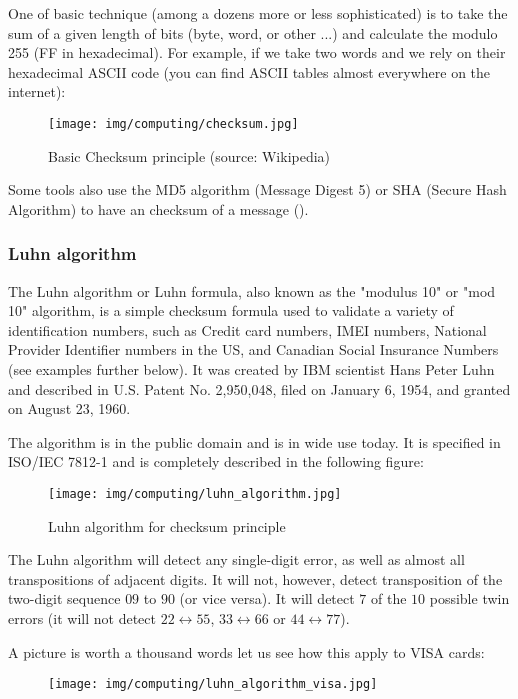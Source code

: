 	One of basic technique (among a dozens more or less sophisticated) is to take the sum of a given length of bits (byte, word, or other ...) and calculate the modulo 255 (FF in hexadecimal). For example, if we take two words and we rely on their hexadecimal ASCII code (you can find ASCII tables almost everywhere on the internet):
	\begin{figure}[H]
		\centering
		\texttt{[image: img/computing/checksum.jpg]}
		\caption[Basic Checksum principle]{Basic Checksum principle (source: Wikipedia)}
	\end{figure}
	Some tools also use the MD5 algorithm (Message Digest 5) or SHA (Secure Hash Algorithm) to have an checksum of a message ().
	
	\subsubsection{Luhn algorithm}
	The Luhn algorithm or Luhn formula, also known as the "modulus 10" or "mod 10" algorithm, is a simple checksum formula used to validate a variety of identification numbers, such as Credit card numbers, IMEI numbers, National Provider Identifier numbers in the US, and Canadian Social Insurance Numbers (see examples further below). It was created by IBM scientist Hans Peter Luhn and described in U.S. Patent No. 2,950,048, filed on January 6, 1954, and granted on August 23, 1960.

	The algorithm is in the public domain and is in wide use today. It is specified in ISO/IEC 7812-1 and is completely described in the following figure:
	\begin{figure}[H]
		\centering
		\texttt{[image: img/computing/luhn\_algorithm.jpg]}
		\caption{Luhn algorithm for checksum principle}
	\end{figure}
	The Luhn algorithm will detect any single-digit error, as well as almost all transpositions of adjacent digits. It will not, however, detect transposition of the two-digit sequence $09$ to $90$ (or vice versa). It will detect $7$ of the $10$ possible twin errors (it will not detect $22 \leftrightarrow 55$, $33 \leftrightarrow 66$ or $44 \leftrightarrow 77$).
	
	A picture is worth a thousand words let us see how this apply to VISA cards:
	\begin{figure}[H]
		\centering
		\texttt{[image: img/computing/luhn\_algorithm\_visa.jpg]}
	\end{figure}

